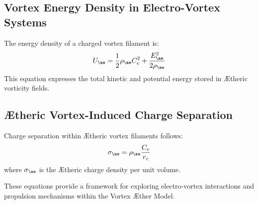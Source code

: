 \subsection{Vortex Energy Density in Electro-Vortex Systems}
The energy density of a charged vortex filament is:
\begin{equation}
    U_{\ae} = \frac{1}{2} \rho_{\text{\ae}} C_e^2 + \frac{E_{\ae}^2}{2 \rho_{\text{\ae}}}
\end{equation}
This equation expresses the total kinetic and potential energy stored in \AE theric vorticity fields.

\subsection{\AE theric Vortex-Induced Charge Separation}
Charge separation within \AE theric vortex filaments follows:
\begin{equation}
    \sigma_{\ae} = \rho_{\text{\ae}} \frac{C_e}{r_c}
\end{equation}
where $\sigma_{\ae}$ is the \AE theric charge density per unit volume.

These equations provide a framework for exploring electro-vortex interactions and propulsion mechanisms within the Vortex \AE ther Model.
